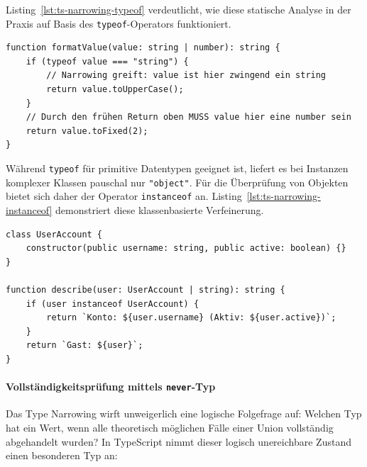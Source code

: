 Listing~\ref{lst:ts-narrowing-typeof} verdeutlicht, wie diese statische Analyse in der Praxis auf Basis des \texttt{typeof}-Operators funktioniert.

\begin{listing}[htbp]
    \caption{ durch Kontrollfluss und \texttt{typeof}}
    \label{lst:ts-narrowing-typeof}
    \begin{verbatim}
function formatValue(value: string | number): string {
    if (typeof value === "string") {
        // Narrowing greift: value ist hier zwingend ein string
        return value.toUpperCase(); 
    }
    // Durch den frühen Return oben MUSS value hier eine number sein
    return value.toFixed(2); 
}
    \end{verbatim}
\end{listing}

Während \texttt{typeof} für primitive Datentypen geeignet ist, liefert es bei Instanzen komplexer Klassen pauschal nur \texttt{"object"}. Für die Überprüfung von Objekten bietet sich daher der Operator \texttt{instanceof} an. Listing~\ref{lst:ts-narrowing-instanceof} demonstriert diese klassenbasierte Verfeinerung.

\begin{listing}[htbp]
    \caption{Klassenprüfung mit \texttt{instanceof}}
    \label{lst:ts-narrowing-instanceof}
    \begin{verbatim}
class UserAccount {
    constructor(public username: string, public active: boolean) {}
}

function describe(user: UserAccount | string): string {
    if (user instanceof UserAccount) {
        return `Konto: ${user.username} (Aktiv: ${user.active})`;
    }
    return `Gast: ${user}`;
}
    \end{verbatim}
\end{listing}


\paragraph{Vollständigkeitsprüfung mittels \texttt{never}-Typ}
\label{par:never}

Das Type Narrowing wirft unweigerlich eine logische Folgefrage auf: Welchen Typ hat ein Wert, wenn alle theoretisch möglichen Fälle einer Union vollständig abgehandelt wurden? In TypeScript nimmt dieser logisch unereichbare Zustand einen besonderen Typ an:

